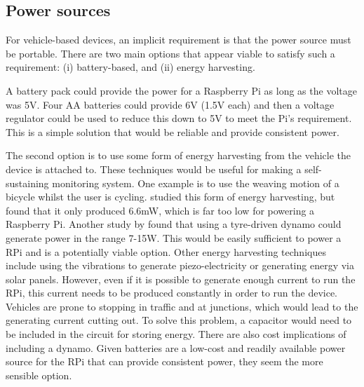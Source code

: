 \documentclass[11pt]{report}
\begin{document}


\subsection{Power sources}

For vehicle-based devices, an implicit requirement is that the power source must be portable. There are two main options that appear viable to satisfy such a requirement: (i) battery-based, and (ii) energy harvesting.

A battery pack could provide the power for a Raspberry Pi as long as the voltage was 5V. Four AA batteries could provide 6V (1.5V each) and then a voltage regulator could be used to reduce this down to 5V to meet the Pi's requirement. This is a simple solution that would be reliable and provide consistent power.

The second option is to use some form of energy harvesting from the vehicle the device is attached to. These techniques would be useful for making a self-sustaining monitoring system. One example is to use the weaving motion of a bicycle whilst the user is cycling. \cite{Yang2012weaving} studied this form of energy harvesting, but found that it only produced 6.6mW, which is far too low for powering a Raspberry Pi. Another study by \cite{hui2011energyharvestingbicycle} found that using a tyre-driven dynamo could generate power in the range 7-15W. This would be easily sufficient to power a RPi and is a potentially viable option. Other energy harvesting techniques include using the vibrations to generate piezo-electricity or generating energy via solar panels. However, even if it is possible to generate enough current to run the RPi, this current needs to be produced constantly in order to run the device. Vehicles are prone to stopping in traffic and at junctions, which would lead to the generating current cutting out. To solve this problem, a capacitor would need to be included in the circuit for storing energy. There are also cost implications of including a dynamo. Given batteries are a low-cost and readily available power source for the RPi that can provide consistent power, they seem the more sensible option.
\end{document}
